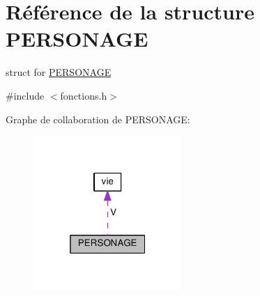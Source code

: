 \hypertarget{structPERSONAGE}{}\section{Référence de la structure P\+E\+R\+S\+O\+N\+A\+GE}
\label{structPERSONAGE}


struct for \hyperlink{structPERSONAGE}{P\+E\+R\+S\+O\+N\+A\+GE}  




{\ttfamily \#include $<$fonctions.\+h$>$}



Graphe de collaboration de P\+E\+R\+S\+O\+N\+A\+GE\+:
\nopagebreak
\begin{figure}[H]
\begin{center}
\leavevmode
\includegraphics[width=160pt]{structPERSONAGE__coll__graph}
\end{center}
\end{figure}
